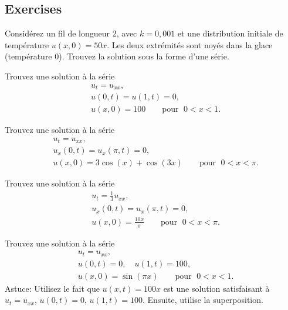 \subsection{Exercises}

\begin{exercise}
Considérez un fil de longueur 2,  avec $ k = 0,001 $ et une 
distribution initiale de température $ u (x, 0) = 50 x $.  Les deux extrémités
sont noyés dans la glace (température 0).  Trouvez la solution sous la forme d'une série.
\end{exercise}

\begin{exercise}
Trouvez une solution à la série 
\begin{align*}
& u_t =  u_{xx} , \\
& u(0,t) = u(1,t) = 0 , \\
& u(x,0) = 100 \qquad \text{pour } \; 0 < x < 1 .
\end{align*}
\end{exercise}

\begin{exercise}
Trouvez une solution à la série 
\begin{align*}
& u_t =  u_{xx} , \\
& u_x(0,t) = u_x(\pi,t) = 0 , \\
& u(x,0) = 3\cos (x) + \cos (3x) \qquad \text{pour } \; 0 < x < \pi .
\end{align*}
\end{exercise}

\begin{exercise} \label{heat:cosexr}
Trouvez une solution à la série 
\begin{align*}
& u_t = \frac{1}{3} u_{xx} , \\
& u_x(0,t) = u_x(\pi,t) = 0 , \\
& u(x,0) = \frac{10x}{\pi} \qquad \text{pour } \; 0 < x < \pi .
\end{align*}
\end{exercise}

\begin{exercise} \label{heat:oneto100exr}
Trouvez une solution à la série 
\begin{align*}
& u_t =  u_{xx} , \\
& u(0, t) = 0 , \quad u(1,t) = 100 , \\
& u(x, 0) = \sin (\pi x) \qquad \text{pour } \; 0 < x < 1 .
\end{align*}
Astuce: Utilisez le fait que $u(x, t) = 100 x$ est une solution satisfaisant à 
$u_t = u_{xx}$, $u(0, t) = 0$, $u(1, t) = 100$.  Ensuite, utilise la superposition.
\end{exercise}

